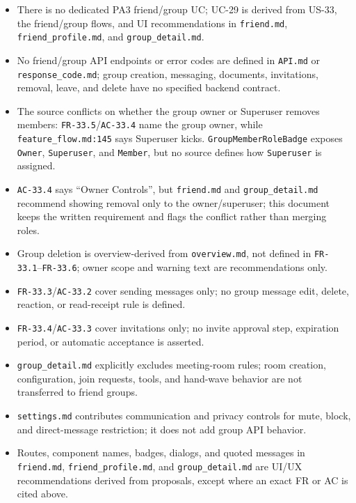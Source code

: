 \documentclass[12pt]{article}
\begin{document}
\begin{itemize}
\item There is no dedicated PA3 friend/group UC; UC-29 is derived from US-33, the friend/group flows, and UI recommendations in \texttt{friend.md}, \texttt{friend\_profile.md}, and \texttt{group\_detail.md}.
\item No friend/group API endpoints or error codes are defined in \texttt{API.md} or \texttt{response\_code.md}; group creation, messaging, documents, invitations, removal, leave, and delete have no specified backend contract.
\item The source conflicts on whether the group owner or Superuser removes members: \texttt{FR-33.5}/\texttt{AC-33.4} name the group owner, while \texttt{feature\_flow.md:145} says Superuser kicks. \texttt{GroupMemberRoleBadge} exposes \texttt{Owner}, \texttt{Superuser}, and \texttt{Member}, but no source defines how \texttt{Superuser} is assigned.
\item \texttt{AC-33.4} says “Owner Controls”, but \texttt{friend.md} and \texttt{group\_detail.md} recommend showing removal only to the owner/superuser; this document keeps the written requirement and flags the conflict rather than merging roles.
\item Group deletion is overview-derived from \texttt{overview.md}, not defined in \texttt{FR-33.1}--\texttt{FR-33.6}; owner scope and warning text are recommendations only.
\item \texttt{FR-33.3}/\texttt{AC-33.2} cover sending messages only; no group message edit, delete, reaction, or read-receipt rule is defined.
\item \texttt{FR-33.4}/\texttt{AC-33.3} cover invitations only; no invite approval step, expiration period, or automatic acceptance is asserted.
\item \texttt{group\_detail.md} explicitly excludes meeting-room rules; room creation, configuration, join requests, tools, and hand-wave behavior are not transferred to friend groups.
\item \texttt{settings.md} contributes communication and privacy controls for mute, block, and direct-message restriction; it does not add group API behavior.
\item Routes, component names, badges, dialogs, and quoted messages in \texttt{friend.md}, \texttt{friend\_profile.md}, and \texttt{group\_detail.md} are UI/UX recommendations derived from proposals, except where an exact FR or AC is cited above.
\end{itemize}
\par\medskip
\end{document}
